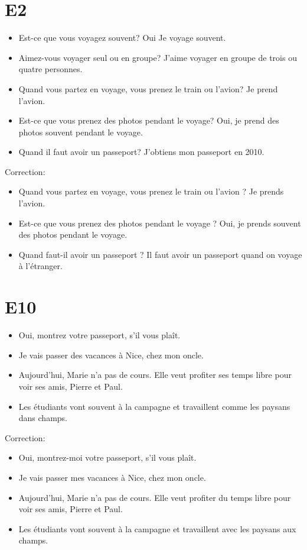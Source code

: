 \documentclass{book}
\begin{document}
    \section{E2}
        \begin{itemize}
            \item Est-ce que vous voyagez souvent? Oui Je voyage souvent.
            \item Aimez-vous voyager seul ou en groupe? J'aime voyager en groupe de trois ou quatre personnes.
            \item Quand vous partez en voyage, vous prenez le train ou l'avion? Je prend l'avion.
            \item Est-ce que vous prenez des photos pendant le voyage? Oui, je prend des photos souvent pendant le voyage.
            \item Quand il faut avoir un passeport? J'obtiens mon passeport en 2010.
        \end{itemize}
        Correction:
        \begin{itemize}
            \item Quand vous partez en voyage, vous prenez le train ou l'avion ? Je prends l'avion.
            \item Est-ce que vous prenez des photos pendant le voyage ? Oui, je prends souvent des photos pendant le voyage.
            \item Quand faut-il avoir un passeport ? Il faut avoir un passeport quand on voyage à l'étranger.
        \end{itemize}

    \section{E10}
        \begin{itemize}
            \item Oui, montrez votre passeport, s'il vous plaît.
            \item Je vais passer des vacances à Nice, chez mon oncle.
            \item Aujourd'hui, Marie n'a pas de cours. Elle veut profiter ses temps libre pour voir ses amis, Pierre et Paul.
            \item Les étudiants vont souvent à la campagne et travaillent comme les paysans dans champs.
        \end{itemize}
        Correction:
        \begin{itemize}
            \item Oui, montrez-moi votre passeport, s'il vous plaît.
            \item Je vais passer mes vacances à Nice, chez mon oncle.
            \item Aujourd'hui, Marie n'a pas de cours. Elle veut profiter du temps libre pour voir ses amis, Pierre et Paul.
            \item Les étudiants vont souvent à la campagne et travaillent avec les paysans aux champs.
        \end{itemize}
\end{document}
